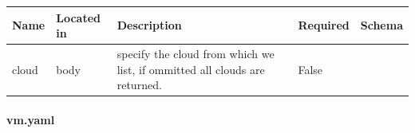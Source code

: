 \documentclass[9pt,]{article}
\let\oldparagraph\paragraph
\renewcommand{\paragraph}[1]{\oldparagraph{#1}\mbox{}}
\begin{document}
\begin{longtable}[]{@{}lllll@{}}
\toprule
\begin{minipage}[b]{0.10\columnwidth}\raggedright
Name\strut
\end{minipage} & \begin{minipage}[b]{0.11\columnwidth}\raggedright
Located in\strut
\end{minipage} & \begin{minipage}[b]{0.40\columnwidth}\raggedright
Description\strut
\end{minipage} & \begin{minipage}[b]{0.12\columnwidth}\raggedright
Required\strut
\end{minipage} & \begin{minipage}[b]{0.12\columnwidth}\raggedright
Schema\strut
\end{minipage}\tabularnewline
\midrule
\endhead
\begin{minipage}[t]{0.10\columnwidth}\raggedright
cloud\strut
\end{minipage} & \begin{minipage}[t]{0.11\columnwidth}\raggedright
body\strut
\end{minipage} & \begin{minipage}[t]{0.40\columnwidth}\raggedright
specify the cloud from which we list, if ommitted all clouds are
returned.\strut
\end{minipage} & \begin{minipage}[t]{0.12\columnwidth}\raggedright
False\strut
\end{minipage} & \begin{minipage}[t]{0.12\columnwidth}\raggedright
\strut
\end{minipage}\tabularnewline
\bottomrule
\end{longtable}

\hypertarget{vm.yaml}{%
\paragraph{vm.yaml}\label{vm.yaml}}
\end{document}
